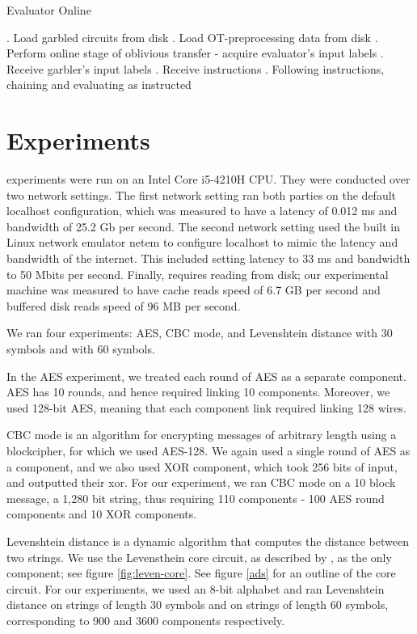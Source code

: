 \begin{algorithm}
    \caption{Evaluator Online}
    \label{alg:evaluator-online}
    \begin{algorithmic}
        . Load garbled circuits from disk
        . Load OT-preprocessing data from disk
        . Perform online stage of oblivious transfer - acquire evaluator's input labels
        . Receive garbler's input labels
        . Receive instructions
        . Following instructions, chaining and evaluating as instructed
    \end{algorithmic}
\end{algorithm}

\section{Experiments}

\CompGC experiments were run on an Intel Core i5-4210H CPU. 
They were conducted over two network settings. 
The first network setting ran both parties on the default localhost configuration, which was measured to have a latency of 0.012 ms and bandwidth of 25.2 Gb per second. 
The second network setting used the built in Linux network emulator {\sf netem} to configure localhost to mimic the latency and bandwidth of the internet. 
This included setting latency to 33 ms and bandwidth to 50 Mbits per second. 
Finally, \CompGC requires reading from disk; our experimental machine was measured to have cache reads speed of 6.7 GB per second and buffered disk reads speed of 96 MB per second.

We ran four experiments: AES, CBC mode, and Levenshtein distance with 30 symbols and with 60 symbols. 

In the AES experiment, we treated each round of AES as a separate component. AES has 10 rounds, and hence required linking 10 components. Moreover, we used 128-bit AES, meaning that each component link required linking 128 wires. 

CBC mode is an algorithm for encrypting messages of arbitrary length using a blockcipher, for which we used AES-128. 
We again used a single round of AES as a component, and we also used XOR component, which took 256 bits of input, and outputted their xor. 
For our experiment, we ran CBC mode on a 10 block message, a 1,280 bit string, thus requiring 110 components - 100 AES round components and 10 XOR components. 

Levenshtein distance is a dynamic algorithm that computes the distance between two strings. 
We use the Levensthein core circuit, as described by \cite{faster2pc}, as the only component; see figure \ref{fig:leven-core}.
See figure \ref{ads} for an outline of the core circuit. 
For our experiments, we used an 8-bit alphabet and ran Levenshtein distance on strings of length 30 symbols and on strings of length 60 symbols, corresponding to 900 and 3600 components respectively. 

